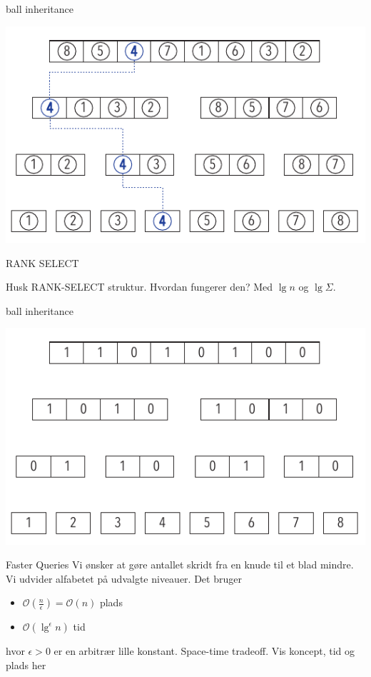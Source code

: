 \documentclass[pdf]{beamer}
\begin{document}
\begin{frame}{ball inheritance}
  \begin{center}
    \includegraphics[scale=1.0]{pictures/bolde_4.pdf}
  \end{center}
\end{frame}


\begin{frame}{RANK SELECT}

  Husk RANK-SELECT struktur. Hvordan fungerer den? Med $\lg n$ og $\lg \Sigma$.

\end{frame}


\begin{frame}{ball inheritance}
  \begin{center}
    \includegraphics[scale=1.0]{pictures/uden_bolde.pdf}
  \end{center}
\end{frame}



\begin{frame}{Faster Queries}
  Vi ønsker at gøre antallet skridt fra en knude til et blad mindre. Vi udvider alfabetet på udvalgte niveauer.
  Det bruger
  \begin{itemize}
    \item $\mathcal{O}(\frac{n}{\epsilon}) = \mathcal{O}(n)$ plads
    \item $\mathcal{O}(\lg^\epsilon n)$ tid
  \end{itemize}
  hvor $\epsilon > 0$ er en arbitrær lille konstant. Space-time tradeoff.
  Vis koncept, tid og plads her
\end{frame}
\end{document}
